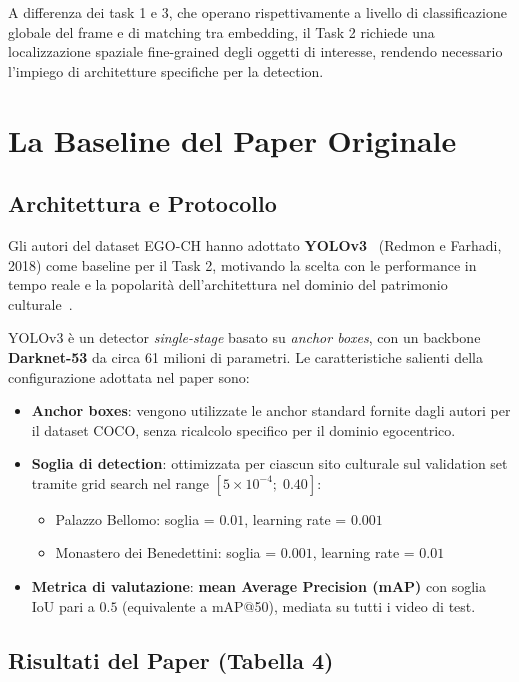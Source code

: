 \documentclass[a4paper,12pt]{report}
\begin{document}
A differenza dei task 1 e 3, che operano rispettivamente a livello di classificazione globale del frame e di matching tra embedding, il Task 2 richiede una localizzazione spaziale fine-grained degli oggetti di interesse, rendendo necessario l'impiego di architetture specifiche per la detection.

\section{La Baseline del Paper Originale}
\label{sec:baseline}

\subsection{Architettura e Protocollo}

Gli autori del dataset EGO-CH hanno adottato \textbf{YOLOv3}~\cite{yolov3} (Redmon e Farhadi, 2018) come baseline per il Task 2, motivando la scelta con le performance in tempo reale e la popolarità dell'architettura nel dominio del patrimonio culturale~\cite{egoref}.

YOLOv3 è un detector \emph{single-stage} basato su \emph{anchor boxes}, con un backbone \textbf{Darknet-53} da circa 61 milioni di parametri. Le caratteristiche salienti della configurazione adottata nel paper sono:

\begin{itemize}
    \item \textbf{Anchor boxes}: vengono utilizzate le anchor standard fornite dagli autori per il dataset COCO, senza ricalcolo specifico per il dominio egocentrico.
    \item \textbf{Soglia di detection}: ottimizzata per ciascun sito culturale sul validation set tramite grid search nel range $[5 \times 10^{-4};\; 0.40]$:
    \begin{itemize}
        \item Palazzo Bellomo: soglia = $0.01$, learning rate = $0.001$
        \item Monastero dei Benedettini: soglia = $0.001$, learning rate = $0.01$
    \end{itemize}
    \item \textbf{Metrica di valutazione}: \textbf{mean Average Precision (mAP)} con soglia IoU pari a $0.5$ (equivalente a mAP@50), mediata su tutti i video di test.
\end{itemize}

\subsection{Risultati del Paper (Tabella 4)}
\end{document}
